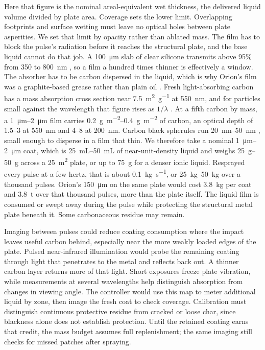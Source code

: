\documentclass{article}
\begin{document}
Here that figure is the nominal areal-equivalent wet thickness, the delivered liquid volume divided by plate area.
Coverage sets the lower limit.
Overlapping footprints and surface wetting must leave no optical holes between plate asperities.
We set that limit by opacity rather than ablated mass.
The film has to block the pulse's radiation before it reaches the structural plate, and the base liquid cannot do that job.
A \SI{100}{\micro\meter} slab of clear silicone transmits above 95\% from 350 to \SI{800}{\nano\meter} \cite{liu2015_pdms_transparency}, so a film a hundred times thinner is effectively a window.
The absorber has to be carbon dispersed in the liquid, which is why Orion's film was a graphite-based grease rather than plain oil \cite{projorion}.
Fresh light-absorbing carbon has a mass absorption cross section near \SI{7.5}{\square\meter\per\gram} at \SI{550}{\nano\meter}, and for particles small against the wavelength that figure rises as $1/\lambda$ \cite{bond2006_lac_absorption}.
At a fifth carbon by mass, a \SIrange{1}{2}{\micro\meter} film carries \SIrange{0.2}{0.4}{\gram\per\square\meter} of carbon, an optical depth of \numrange{1.5}{3} at \SI{550}{\nano\meter} and \numrange{4}{8} at \SI{200}{\nano\meter}.
Carbon black spherules run \SIrange{20}{50}{\nano\meter} \cite{bond2006_lac_absorption}, small enough to disperse in a film that thin.
We therefore take a nominal \SIrange{1}{2}{\micro\meter} coat, which is \SIrange{25}{50}{\milli\liter} of near-unit-density liquid and weighs \SIrange{25}{50}{\gram} across a \SI{25}{\square\meter} plate, or up to \SI{75}{\gram} for a denser ionic liquid.
Resprayed every pulse at a few hertz, that is about \SI{0.1}{\kilo\gram\per\second}, or \SIrange{25}{50}{\kilo\gram} over a thousand pulses.
Orion's \SI{150}{\micro\meter} on the same plate would cost \SI{3.8}{\kilo\gram} per coat and \SI{3.8}{\tonne} over that thousand pulses, more than the plate itself.
The liquid film is consumed or swept away during the pulse while protecting the structural metal plate beneath it. Some carbonaceous residue may remain.

Imaging between pulses could reduce coating consumption where the impact leaves useful carbon behind, especially near the more weakly loaded edges of the plate. Pulsed near-infrared illumination would probe the remaining coating through light that penetrates to the metal and reflects back out. A thinner carbon layer returns more of that light. Short exposures freeze plate vibration, while measurements at several wavelengths help distinguish absorption from changes in viewing angle. The controller would use this map to meter additional liquid by zone, then image the fresh coat to check coverage. Calibration must distinguish continuous protective residue from cracked or loose char, since blackness alone does not establish protection. Until the retained coating earns that credit, the mass budget assumes full replenishment; the same imaging still checks for missed patches after spraying.
\end{document}
